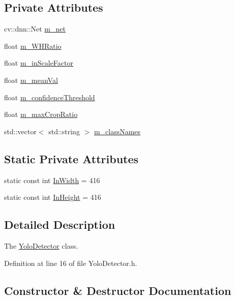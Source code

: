 \subsection*{Private Attributes}
\begin{DoxyCompactItemize}
\item 
cv\+::dnn\+::\+Net \mbox{\hyperlink{class_yolo_detector_ac5a1c603d2c9eaabf78549ca0125c1c7}{m\+\_\+net}}
\item 
float \mbox{\hyperlink{class_yolo_detector_ab6b6271101b6d3a78af10c8802ac88af}{m\+\_\+\+W\+H\+Ratio}}
\item 
float \mbox{\hyperlink{class_yolo_detector_afc6432eab72fdf319af7f48753ecbcd1}{m\+\_\+in\+Scale\+Factor}}
\item 
float \mbox{\hyperlink{class_yolo_detector_a126a0a3c1f91c9e6e3a878638d4b0bff}{m\+\_\+mean\+Val}}
\item 
float \mbox{\hyperlink{class_yolo_detector_a78b57c44b28d1f817940177d197612ed}{m\+\_\+confidence\+Threshold}}
\item 
float \mbox{\hyperlink{class_yolo_detector_a86e05dcc3f10e2b0a1522f7513ff89e5}{m\+\_\+max\+Crop\+Ratio}}
\item 
std\+::vector$<$ std\+::string $>$ \mbox{\hyperlink{class_yolo_detector_aa0a06104a5778e9009ebfb0bbc6cecab}{m\+\_\+class\+Names}}
\end{DoxyCompactItemize}
\subsection*{Static Private Attributes}
\begin{DoxyCompactItemize}
\item 
static const int \mbox{\hyperlink{class_yolo_detector_a01461f7ada4da3e8027d805f7129bab4}{In\+Width}} = 416
\item 
static const int \mbox{\hyperlink{class_yolo_detector_a8511b801a9410af0b2715d4236a4b127}{In\+Height}} = 416
\end{DoxyCompactItemize}


\subsection{Detailed Description}
The \mbox{\hyperlink{class_yolo_detector}{Yolo\+Detector}} class. 

Definition at line 16 of file Yolo\+Detector.\+h.



\subsection{Constructor \& Destructor Documentation}
\mbox{\label{class_yolo_detector_a60f435b2aa412d583038300d086255de}} 
